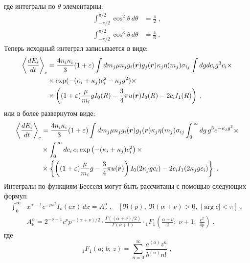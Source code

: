 где интегралы по $\theta$ элементарны:
\begin{equation}
  \begin{split}
    \int_{-\pi/2}^{\pi/2} \cos^2\theta\,d\theta &= \frac{\pi}{2}\;,\\
    \int_{-\pi/2}^{\pi/2} \cos^3\theta\,d\theta &= \frac{4}{3}\;.
  \end{split}
\end{equation}
Теперь исходный интеграл записывается в виде:
\begin{equation}
  \begin{split}
    \left\langle\frac{dE_i}{dt}\right\rangle_c &= \frac{4n_i\kappa_i}{3}(1+\varepsilon)\int dm_j\mu n_jg_i(\bm{r})g_j(\bm{r})\kappa_j\eta(m_j)\sigma_{ij}
    \int dgdc_i g^3c_i\times\\
    &\times\exp(-(\kappa_i+\kappa_j)c^2_i-\kappa_jg^2)\times\\
    &\times\left((1+\varepsilon)\frac{\mu}{m_i}gI_0(R)-\frac{3}{4}\pi u(\bm{r})I_0(R)-2c_iI_1(R)\right)\;,
  \end{split}
\end{equation}
или в более развернутом виде:
\begin{equation}
  \begin{split}
    \left\langle\frac{dE_i}{dt}\right\rangle_c &= \frac{4n_i\kappa_i}{3}(1+\varepsilon)\int dm_j\mu n_jg_i(\bm{r})g_j(\bm{r})\kappa_j\eta(m_j)\sigma_{ij}
    \int_{0}^{\infty}dg\,g^3e^{-\kappa_jg^2}\times\\
    &\times\int_{0}^{\infty}dc_i\,c_i\exp\left(-(\kappa_i+\kappa_j)c^2_i\right)\times\\
    &\times\left\{\left((1+\varepsilon)\frac{\mu}{m_i}g-\frac{3}{4}\pi u(\bm{r})\right)I_0(2\kappa_jgc_i)-2c_iI_1(2\kappa_jgc_i)\right\}\;.
  \end{split}
\end{equation}
Интегралы по функциям Бесселя могут быть рассчитаны с помощью следующих формул:
\begin{equation}
  \begin{split}
    \int_{0}^{\infty}&x^{\alpha-1}e^{-px^2}I_{\nu}(cx)\,dx = A^{\alpha}_{\nu}\;,\;\;\;\left[\Re(p),\;\Re(\alpha+\nu)>0,\;\vert\arg c\vert<\pi\right]\;,\\
    &A^{\alpha}_{\nu}=2^{-\nu-1}c^{\nu}p^{-(\alpha+\nu)/2}\cdot\frac{\Gamma((\alpha+\nu)/2)}{\Gamma(\nu+1)}\cdot
    \mbox{}_{1}F_{1}\left(\frac{\alpha+\nu}{2};\;\nu+1;\;\frac{c^2}{4p}\right)\;,
  \end{split}
\end{equation}
где 
\begin{equation}
  \mbox{}_{1}F_{1}(a;\,b;\,z) = \sum_{n=0}^{\infty}\frac{a^{(a)}z^n}{b^{(n)}n!}\;,
\end{equation}
